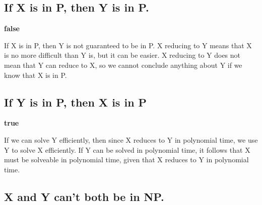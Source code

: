 \documentclass{article}
\begin{document}
    \subsection{If X is in P, then Y is in P.}
    
    \textbf{false}
    
    If X is in P, then Y is not guaranteed to be in P.  X reducing to Y means that X is no more difficult than Y is, but it can be easier.  X reducing to Y does not mean that Y can reduce to X, so we cannot conclude anything about Y if we know that X is in P.
    
    \subsection{If Y is in P, then X is in P}
    
    \textbf{true}
    
    If we can solve Y efficiently, then since X reduces to Y in polynomial time, we use Y to solve X efficiently.  If Y can be solved in polynomial time, it follows that X must be solveable in polynomial time, given that X reduces to Y in polynomial time.
    
    \subsection{X and Y can't both be in NP.}

\section{}

\section{}

    \subsection{}
    
    \subsection{}
\end{document}
